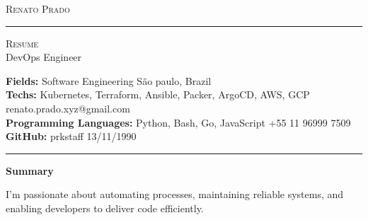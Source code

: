 \documentclass[10pt,A4]{article}
\newcommand{\cvsection}[1]
{
	\begin{center}
		\large\textcolor{sectcol}{\textbf{#1}}
	\end{center}
}
\newcommand{\metasection}[2]
{
\footnotesize{#2} \hspace*{\fill} \footnotesize{#1}\\[1pt]
}
\begin{document}
\pagestyle{fancy}








\vspace{-8pt}
\begin{center}
	\HUGE \textsc{Renato Prado} \textcolor{sectcol}{\rule[-1mm]{1mm}{0.9cm}} \textsc{Resume}\\[2pt]
	\small DevOps Engineer
\end{center}



\vspace{6pt}


\metasection{São paulo, Brazil}{\textbf{Fields:} Software Engineering}
\metasection{renato.prado.xyz@gmail.com}{\textbf{Techs:} Kubernetes, Terraform, Ansible, Packer, ArgoCD, AWS, GCP}
\metasection{+55 11 96999 7509}{\textbf{Programming Languages:} Python, Bash, Go, JavaScript}
\metasection{13/11/1990}{\textbf{GitHub:} prkstaff}
\vspace{-2pt}
\textcolor{softcol}{\hrule}
\vspace{6pt}

\normalsize

\vspace{-6pt}
\cvsection{Summary}
I'm passionate about automating processes, maintaining reliable systems, and enabling developers to deliver code efficiently.\\
\end{document}
